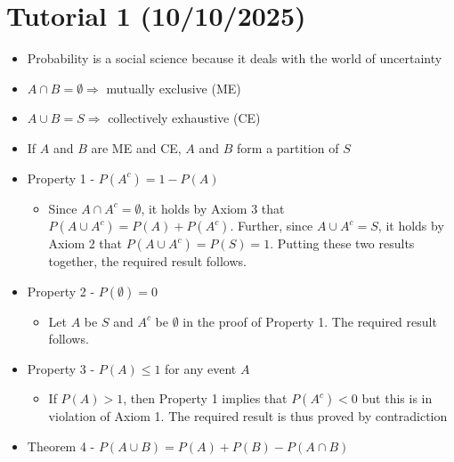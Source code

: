 \documentclass{article}
\begin{document}
\section{Tutorial 1 (10/10/2025)}
\begin{itemize}
    \item Probability is a social science because it deals with the world of uncertainty
    \item $A \cap B = \emptyset \Rightarrow $ mutually exclusive (ME)
    \item $A \cup B = S \Rightarrow $ collectively exhaustive (CE)
    \item If $A$ and $B$ are ME and CE, $A$ and $B$ form a partition of $S$
    \item Property 1 - $P(A^c)=1-P(A)$
    \begin{itemize}
        \item Since $A \cap A^c = \emptyset$, it holds by Axiom 3 that $P(A \cup A^c) = P(A) + P(A^c)$. Further, since $A \cup A^c = S$, it holds by Axiom 2 that $P(A \cup A^c) = P(S) = 1$. Putting these two results together, the required result follows.
    \end{itemize}
    \item Property 2 - $P(\emptyset) = 0$
    \begin{itemize}
        \item Let $A$ be $S$ and $A^c$ be $\emptyset$ in the proof of Property 1. The required result follows.
    \end{itemize}
    \item Property 3 - $P(A) \le 1$ for any event $A$
    \begin{itemize}
        \item If $P(A) > 1$, then Property 1 implies that $P(A^c) < 0$ but this is in violation of Axiom 1. The required result is thus proved by contradiction
    \end{itemize}
    \item Theorem 4 - $P(A \cup B)=P(A)+P(B)-P(A \cap B)$
\end{itemize}
\end{document}
